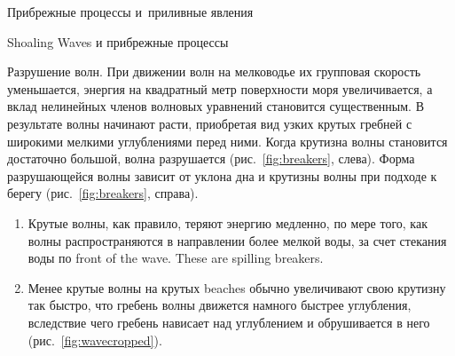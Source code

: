 \begin{chapter}{Прибрежные процессы и~приливные явления}
\begin{section}{Shoaling Waves и прибрежные процессы}
\begin{paragraph}{Разрушение волн.}
При движении волн на мелководье их групповая скорость 
уменьшается, энергия на квадратный метр поверхности моря увеличивается, 
а вклад нелинейных членов волновых уравнений становится существенным. 
В результате
волны начинают расти, приобретая вид узких крутых гребней с широкими
мелкими углублениями перед ними.
Когда крутизна волны становится достаточно большой,
волна разрушается (рис.~\ref{fig:breakers}, слева). Форма разрушающейся волны
зависит от уклона дна и крутизны волны при подходе к берегу 
(рис.~\ref{fig:breakers}, справа).
%
%
\begin{enumerate}
\item 
Крутые волны, как правило, теряют энергию медленно, по мере того, как волны
распространяются в направлении более мелкой воды, за счет стекания воды
по front of the wave. 
These are spilling breakers.
%

\item
Менее крутые волны на крутых beaches обычно увеличивают свою крутизну
так быстро, что гребень волны движется намного быстрее углубления, 
вследствие чего гребень нависает над углублением и обрушивается 
в него (рис.~\ref{fig:wavecropped}).
%


\end{enumerate}
\end{paragraph}
\end{section}
\end{chapter}
